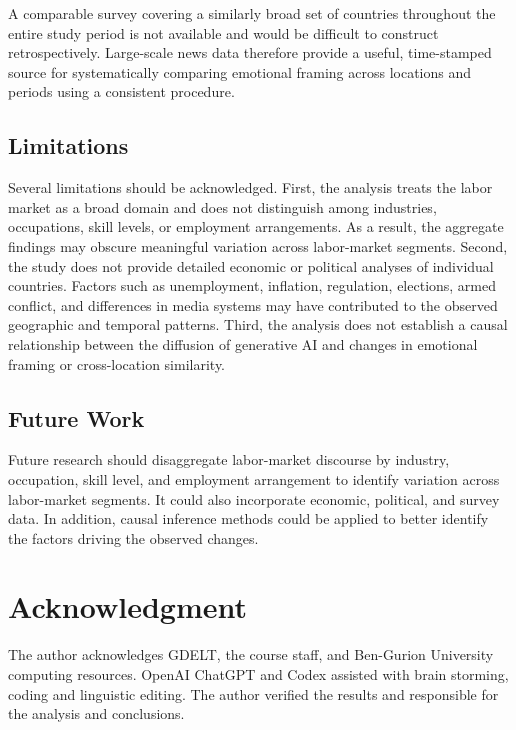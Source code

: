 \documentclass[conference]{IEEEtran}
\begin{document}
A comparable survey covering a similarly broad set of countries 
throughout the entire study period is not available and would 
be difficult to construct retrospectively. 
Large-scale news data therefore provide a useful, 
time-stamped source for systematically comparing emotional framing across 
locations and periods using a consistent procedure.


\subsection{Limitations}

Several limitations should be acknowledged. 
First, the analysis treats the labor market as a broad domain and 
does not distinguish among industries, occupations, skill levels, 
or employment arrangements. 
As a result, the aggregate findings may obscure meaningful 
variation across labor-market segments. 
Second, the study does not provide detailed economic or political analyses 
of individual countries. 
Factors such as unemployment, inflation, regulation, elections, 
armed conflict, and differences in media systems may have contributed 
to the observed geographic and temporal patterns. 
Third, the analysis does not establish a causal relationship between the 
diffusion of generative AI and changes in emotional framing or 
cross-location similarity. 

\subsection{Future Work}

Future research should disaggregate labor-market discourse 
by industry, occupation, skill level, and employment arrangement 
to identify variation across labor-market segments. 
It could also incorporate economic, political, and survey data.
In addition, causal inference methods could be applied 
to better identify the factors driving the observed changes.


\section*{Acknowledgment}

The author acknowledges GDELT, the course staff, and Ben-Gurion University
computing resources. OpenAI ChatGPT and Codex assisted with brain storming, 
coding and linguistic editing. The author verified the results and
responsible for the analysis and conclusions.


\FloatBarrier
\clearpage
\twocolumn[]


\end{document}
